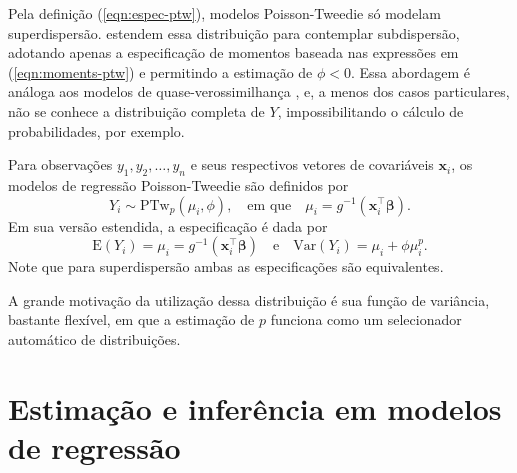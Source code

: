 \documentclass[
    oldfontcommands,
    11pt,
    openright,
    twoside,
    a4paper,
    english,
    brazil
]{abntex2}\usepackage[]{graphicx}\usepackage[]{color}
\begin{document}
Pela definição (\ref{eqn:espec-ptw}), modelos Poisson-Tweedie só modelam
superdispersão. \citet{Bonat2018} estendem essa distribuição para
contemplar subdispersão, adotando apenas a especificação de momentos
baseada nas expressões em (\ref{eqn:moments-ptw}) e permitindo a
estimação de $\phi<0$. Essa abordagem é análoga aos modelos de
quase-verossimilhança \citep{Wedderburn1974}, e, a menos dos casos
particulares, não se conhece a distribuição completa de $Y$,
impossibilitando o cálculo de probabilidades, por exemplo.

Para observações $y_1, y_2, \ldots, y_n$ e seus respectivos vetores de
covariáveis $\bm{x}_i$, os modelos de regressão Poisson-Tweedie são
definidos por
$$
Y_i \sim \text{PTw}_p(\mu_i, \phi), \quad \text{em que} \quad
  \mu_i = g^{-1}(\bm{x}_i^\top\bm{\beta}).
$$
Em sua versão estendida, a especificação é dada por
$$
\text{E}(Y_i) = \mu_i = g^{-1}(\bm{x}_i^\top\bm{\beta})
  \quad \text{e} \quad
\text{Var}(Y_i) = \mu_i + \phi\mu_i^p.
$$
Note que para superdispersão ambas as especificações são equivalentes.

A grande motivação da utilização dessa distribuição é sua função de
variância, bastante flexível, em que a estimação de $p$ funciona como um
selecionador automático de distribuições.

\section{Estimação e inferência em modelos de regressão}
\label{sec:estimacao-e-inferencia}
\end{document}
